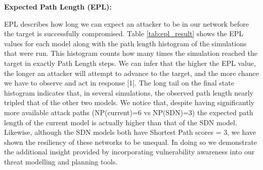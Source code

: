 
\textbf{Expected Path Length (EPL):  }

EPL describes how long we can expect an attacker to be in our network before the target is successfully compromised. Table \ref{tab:epl_result} shows the EPL values for each model along with the path length histogram of the simulations that were run. This histogram counts how many times the simulation reached the target in exactly Path Length steps. We can infer that the higher the EPL value, the longer an attacker will attempt to advance to the target, and the more chance we have to observe and act in response [1]. The long tail on the final state histogram indicates that, in several simulations, the observed path length nearly tripled that of the other two models. We notice that, despite having significantly more available attack paths (NP(current)=6 vs NP(SDN)=3) the expected path length of the current model is actually higher than that of the SDN model. Likewise, although the SDN models  both have Shortest Path scores = 3, we have shown the resiliency of these networks to be unequal.  In doing so we demonstrate the additional insight provided by incorporating vulnerability awareness into our threat modelling and planning tools.

\begin{table*}[ht]
\caption{Expected Path Length Results}
\label{tab:epl_result}
\end{table*}


 